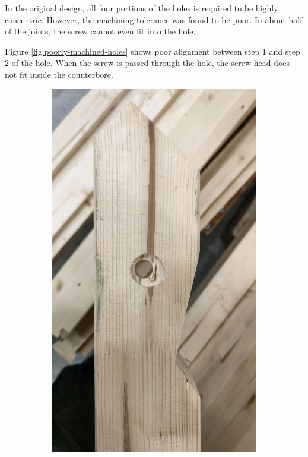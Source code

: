 In the original design, all four portions of the holes is required to be highly concentric. However, the machining tolerance was found to be poor. In about half of the joints, the screw cannot even fit into the hole.

Figure \ref{fig:poorly-machined-holes} shows poor alignment between step 1 and step 2 of the hole. When the screw is passed through the hole, the screw head does not fit inside the counterbore.

\begin{figure}[!h]
    \centering
    \begin{subfigure}[b]{0.49\textwidth}
        \centering
        \includegraphics[width=\textwidth]{images/7b/img69.jpg}

\end{subfigure}
\end{figure}
